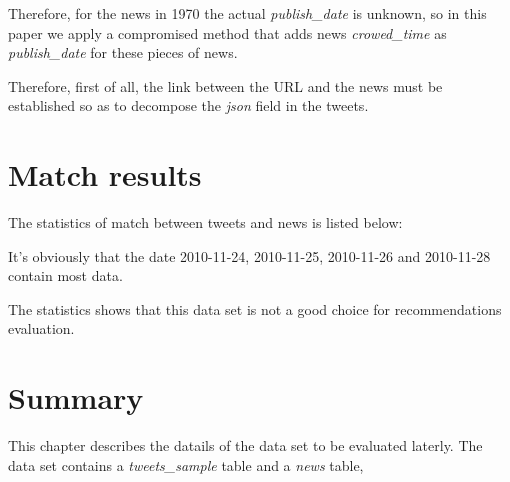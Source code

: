 Therefore, for the news in 1970 the actual \textit{publish\_date} is unknown, so in this paper we apply a compromised method that adds news \textit{crowed\_time} as \textit{publish\_date} for these pieces of news. 

Therefore, first of all, the link between the URL and the news must be established so as to decompose the \textit{json} field in the tweets.

\section{Match results}
The statistics of match between tweets and news is listed below:



It's obviously that the date 2010-11-24, 2010-11-25, 2010-11-26 and 2010-11-28 contain most data.

The statistics shows that this data set is not a good choice for recommendations evaluation.

\section{Summary}
This chapter describes the datails of the data set to be evaluated laterly. The data set contains a \textit{tweets\_sample} table and a \textit{news} table, 
